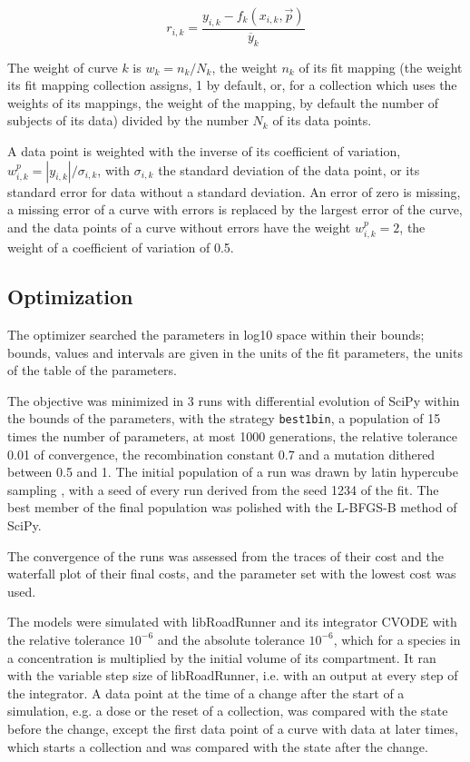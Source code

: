 \begin{equation}
r_{i,k} = \frac{y_{i,k} - f_k(x_{i,k}, \vec{p})}{\overline{y}_k}
\end{equation}

The weight of curve $k$ is $w_k = n_k / N_k$, the weight $n_k$ of its fit mapping (the weight its fit mapping collection assigns, 1 by default, or, for a collection which uses the weights of its mappings, the weight of the mapping, by default the number of subjects of its data) divided by the number $N_k$ of its data points.

A data point is weighted with the inverse of its coefficient of variation, $w^{p}_{i,k} = |y_{i,k}| / \sigma_{i,k}$, with $\sigma_{i,k}$ the standard deviation of the data point, or its standard error for data without a standard deviation. An error of zero is missing, a missing error of a curve with errors is replaced by the largest error of the curve, and the data points of a curve without errors have the weight $w^{p}_{i,k} = 2$, the weight of a coefficient of variation of 0.5.

\subsection{Optimization}

The optimizer searched the parameters in log10 space within their bounds; bounds, values and intervals are given in the units of the fit parameters, the units of the table of the parameters.

The objective was minimized in 3 runs with differential evolution \cite{Storn1997} of SciPy \cite{Virtanen2020} within the bounds of the parameters, with the strategy \texttt{best1bin}, a population of 15 times the number of parameters, at most 1000 generations, the relative tolerance 0.01 of convergence, the recombination constant 0.7 and a mutation dithered between 0.5 and 1. The initial population of a run was drawn by latin hypercube sampling \cite{McKay1979}, with a seed of every run derived from the seed 1234 of the fit. The best member of the final population was polished with the L-BFGS-B method of SciPy.

The convergence of the runs was assessed from the traces of their cost and the waterfall plot of their final costs, and the parameter set with the lowest cost was used.

The models were simulated with libRoadRunner \cite{Welsh2023} and its integrator CVODE \cite{Hindmarsh2005} with the relative tolerance $10^{-6}$ and the absolute tolerance $10^{-6}$, which for a species in a concentration is multiplied by the initial volume of its compartment. It ran with the variable step size of libRoadRunner, i.e. with an output at every step of the integrator. A data point at the time of a change after the start of a simulation, e.g. a dose or the reset of a collection, was compared with the state before the change, except the first data point of a curve with data at later times, which starts a collection and was compared with the state after the change.

